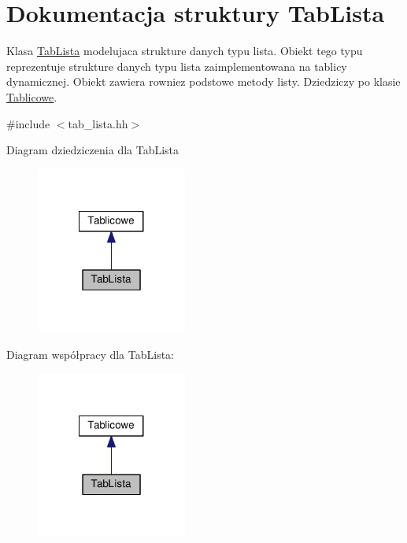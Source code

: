 \hypertarget{struct_tab_lista}{\section{Dokumentacja struktury Tab\-Lista}
\label{struct_tab_lista}
}


Klasa \hyperlink{struct_tab_lista}{Tab\-Lista} modelujaca strukture danych typu lista. Obiekt tego typu reprezentuje strukture danych typu lista zaimplementowana na tablicy dynamicznej. Obiekt zawiera rowniez podstowe metody listy. Dziedziczy po klasie \hyperlink{class_tablicowe}{Tablicowe}.  




{\ttfamily \#include $<$tab\-\_\-lista.\-hh$>$}



Diagram dziedziczenia dla Tab\-Lista\nopagebreak
\begin{figure}[H]
\begin{center}
\leavevmode
\includegraphics[width=140pt]{struct_tab_lista__inherit__graph}
\end{center}
\end{figure}


Diagram współpracy dla Tab\-Lista\-:\nopagebreak
\begin{figure}[H]
\begin{center}
\leavevmode
\includegraphics[width=140pt]{struct_tab_lista__coll__graph}
\end{center}
\end{figure}
